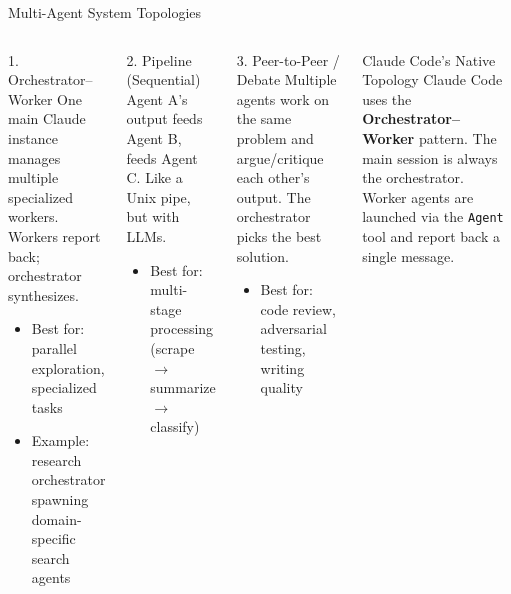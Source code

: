 \documentclass[aspectratio=169,xcolor=dvipsnames]{beamer}
\begin{document}
\begin{frame}{Multi-Agent System Topologies}
    \begin{columns}
        \begin{block}{1. Orchestrator--Worker}
            One main Claude instance manages multiple specialized workers. Workers report back; orchestrator synthesizes.
            \begin{itemize}
                \item Best for: parallel exploration, specialized tasks
                \item Example: research orchestrator spawning domain-specific search agents
            \end{itemize}
        \end{block}
        \begin{block}{2. Pipeline (Sequential)}
            Agent A's output feeds Agent B, feeds Agent C. Like a Unix pipe, but with LLMs.
            \begin{itemize}
                \item Best for: multi-stage processing (scrape $\rightarrow$ summarize $\rightarrow$ classify)
            \end{itemize}
        \end{block}

        \begin{block}{3. Peer-to-Peer / Debate}
            Multiple agents work on the same problem and argue/critique each other's output. The orchestrator picks the best solution.
            \begin{itemize}
                \item Best for: code review, adversarial testing, writing quality
            \end{itemize}
        \end{block}
        \begin{alertblock}{Claude Code's Native Topology}
            Claude Code uses the \textbf{Orchestrator--Worker} pattern. The main session is always the orchestrator. Worker agents are launched via the \texttt{Agent} tool and report back a single message.
        \end{alertblock}
    \end{columns}
\end{frame}
\end{document}
